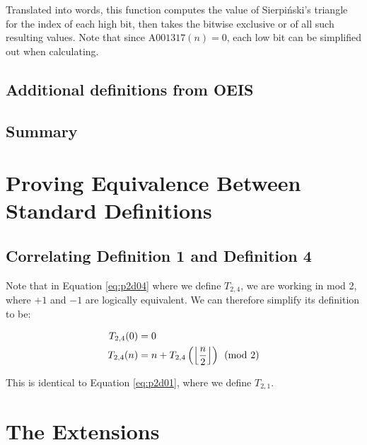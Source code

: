 \documentclass[conference]{IEEEtran}
\begin{document}
Translated into words, this function computes the value of Sierpiński's triangle for the index of each high bit, then takes the bitwise exclusive or of all such resulting values. Note that since $\text{A001317}(n) = 0$, each low bit can be simplified out when calculating.


\subsection{Additional definitions from OEIS}


\subsection{Summary}

\section{Proving Equivalence Between Standard Definitions}

\subsection{Correlating Definition 1 and Definition 4}

Note that in Equation \ref{eq:p2d04} where we define $T_{2,4}$, we are working in mod 2, where $+1$ and $-1$ are logically equivalent. We can therefore simplify its definition to be:

\begin{equation}
    \label{eq:p2d04s}
    \begin{aligned}
T_{2,4}(0) &= 0 \\
T_{2,4}(n) &= n + T_{2,4}\left(\floor{\dfrac{n}{2}}\right) \pmod{2}
    \end{aligned}
\end{equation}

This is identical to Equation \ref{eq:p2d01}, where we define $T_{2,1}$.

\section{The Extensions}
\end{document}
